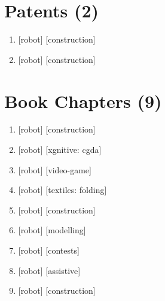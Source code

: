 \documentclass{article}
\begin{document}
\section*{Patents (2)}
\begin{enumerate}
  \item {} [robot] [construction]
  \item {} [robot] [construction]
\end{enumerate}

\section*{Book Chapters (9)}
\begin{enumerate}
  \item {} [robot] [construction]
  \item {} [robot] [xgnitive: cgda]
  \item {} [robot] [video-game]
  \item {} [robot] [textiles: folding]
  \item {} [robot] [construction]
  \item {} [robot] [modelling]
  \item {} [robot] [contests]
  \item {} [robot] [assistive]
  \item {} [robot] [construction]
\end{enumerate}
\end{document}
